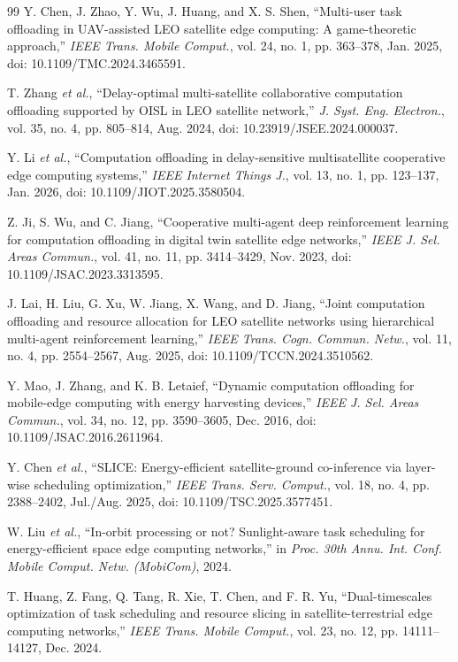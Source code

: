 \documentclass[a4paper,11pt]{article}
\begin{document}
\begin{thebibliography}{99}
Y. Chen, J. Zhao, Y. Wu, J. Huang, and X. S. Shen,
``Multi-user task offloading in UAV-assisted LEO satellite edge computing:
A game-theoretic approach,''
\textit{IEEE Trans. Mobile Comput.},
vol. 24, no. 1, pp. 363--378, Jan. 2025,
doi: 10.1109/TMC.2024.3465591.

T. Zhang \textit{et al.},
``Delay-optimal multi-satellite collaborative computation offloading
supported by OISL in LEO satellite network,''
\textit{J. Syst. Eng. Electron.},
vol. 35, no. 4, pp. 805--814, Aug. 2024,
doi: 10.23919/JSEE.2024.000037.

Y. Li \textit{et al.},
``Computation offloading in delay-sensitive multisatellite
cooperative edge computing systems,''
\textit{IEEE Internet Things J.},
vol. 13, no. 1, pp. 123--137, Jan. 2026,
doi: 10.1109/JIOT.2025.3580504.

Z. Ji, S. Wu, and C. Jiang,
``Cooperative multi-agent deep reinforcement learning for computation
offloading in digital twin satellite edge networks,''
\textit{IEEE J. Sel. Areas Commun.},
vol. 41, no. 11, pp. 3414--3429, Nov. 2023,
doi: 10.1109/JSAC.2023.3313595.

J. Lai, H. Liu, G. Xu, W. Jiang, X. Wang, and D. Jiang,
``Joint computation offloading and resource allocation for LEO satellite
networks using hierarchical multi-agent reinforcement learning,''
\textit{IEEE Trans. Cogn. Commun. Netw.},
vol. 11, no. 4, pp. 2554--2567, Aug. 2025,
doi: 10.1109/TCCN.2024.3510562.

Y. Mao, J. Zhang, and K. B. Letaief,
``Dynamic computation offloading for mobile-edge computing with
energy harvesting devices,''
\textit{IEEE J. Sel. Areas Commun.},
vol. 34, no. 12, pp. 3590--3605, Dec. 2016,
doi: 10.1109/JSAC.2016.2611964.

Y. Chen \textit{et al.},
``SLICE: Energy-efficient satellite-ground co-inference via
layer-wise scheduling optimization,''
\textit{IEEE Trans. Serv. Comput.},
vol. 18, no. 4, pp. 2388--2402, Jul./Aug. 2025,
doi: 10.1109/TSC.2025.3577451.

W. Liu \textit{et al.},
``In-orbit processing or not? Sunlight-aware task scheduling for
energy-efficient space edge computing networks,''
in \textit{Proc. 30th Annu. Int. Conf. Mobile Comput. Netw. (MobiCom)},
2024.

T. Huang, Z. Fang, Q. Tang, R. Xie, T. Chen, and F. R. Yu,
``Dual-timescales optimization of task scheduling and resource
slicing in satellite-terrestrial edge computing networks,''
\textit{IEEE Trans. Mobile Comput.},
vol. 23, no. 12, pp. 14111--14127, Dec. 2024.

\end{thebibliography}
\end{document}
